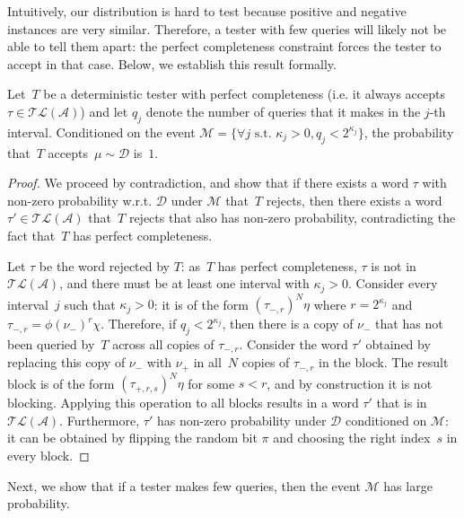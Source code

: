 \documentclass[letterpaper, USenglish, cleveref, autoref, thm-restate, numberwithinsect]{lipics-v2021}
\theoremstyle{theorem}
\theoremstyle{definition}
\newcommand{\Aa}{\mathcal{A}}
\newcommand{\Dd}{\mathcal{D}}
\newcommand{\Mm}{\mathcal{M}}
\newcommand{\timedlang}[1]{\mathcal{TL}( #1 )}
\begin{document}
Intuitively, our distribution is hard to test because positive and negative instances are very similar.
Therefore, a tester with few queries will likely not be able to tell them apart: the perfect completeness constraint forces the tester to accept in that case.
Below, we establish this result formally.
\begin{lemma}\label{lemma:must-accept}
    Let~$T$ be a deterministic tester with perfect completeness (i.e. it always accepts $\tau\in \timedlang{\Aa}$) and let $q_j$ denote the number of queries that it makes in the $j$-th interval.
    Conditioned on the event $\Mm = \{\forall j \text{ s.t. }\kappa_j > 0, q_j < 2^{\kappa_j}\}$, the probability that~$T$ accepts~$\mu \sim{}\Dd$ is~$1$.
\end{lemma}
\begin{proof}
    We proceed by contradiction, and show that if there exists a word $\tau$ with non-zero probability w.r.t. $\Dd$ under $\Mm$ that~$T$ rejects,
    then there exists a word $\tau'\in \timedlang{\Aa}$ that~$T$ rejects that also has non-zero probability, contradicting the fact that~$T$ has perfect completeness.

    Let $\tau$ be the word rejected by $T$: as~$T$ has perfect completeness, $\tau$ is not in $\timedlang{\Aa}$, and there must be at least one interval with $\kappa_j > 0$. Consider every interval~$j$ such that $\kappa_j > 0$: it is of the form $(\tau_{-,r})^N\eta$ where $r = 2^{\kappa_j}$ and $\tau_{-,r} = \phi(\nu_-)^r\chi$.
    Therefore, if $q_j < 2^{\kappa_j}$, then there is a copy of $\nu_-$ that has not been queried by~$T$ across all copies of $\tau_{-,r}$. Consider the word $\tau'$ obtained by replacing this copy of $\nu_-$ with $\nu_+$ in all~$N$ copies of $\tau_{-,r}$ in the block.
    The result block is of the form $(\tau_{+,r,s})^N\eta$ for some $s < r$, and by construction it is not blocking.
    Applying this operation to all blocks results in a word $\tau'$ that is in $\timedlang{\Aa}$.
    Furthermore, $\tau'$ has non-zero probability under $\Dd$ conditioned on $\Mm$: it can be obtained by flipping the random bit $\pi$ and choosing the right index~$s$ in every block.
\end{proof}

Next, we show that if a tester makes few queries, then the event $\Mm$ has large probability.
\end{document}
